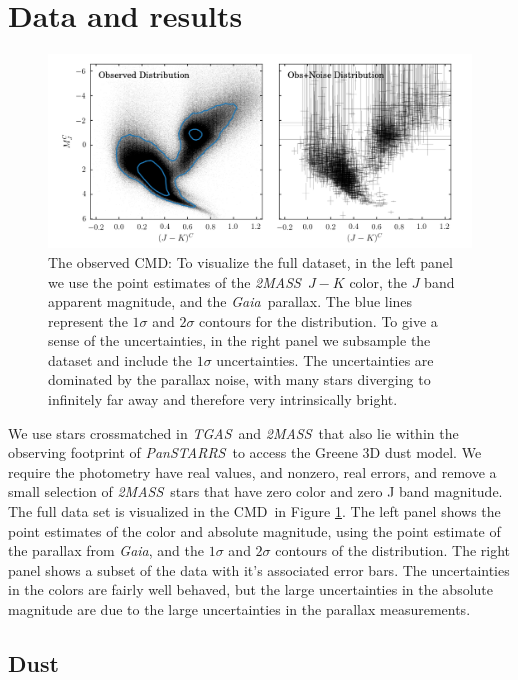 \documentclass[modern]{aastex61}
\newcommand{\acronym}[1]{{\small{#1}}}
\newcommand{\project}[1]{\textsl{#1}}
\newcommand{\tgas}{\project{\acronym{TGAS}}}
\newcommand{\tmass}{\project{\acronym{2MASS}}}
\newcommand{\gaia}{\project{Gaia}}
\newcommand{\panstarrs}{\project{Pan\acronym{STARRS}}}
\newcommand{\cmd}{\acronym{CMD}}
\begin{document}
\section{Data and results}
\begin{figure}
\centering
  \includegraphics[width=\textwidth]{data.png}
\caption{The observed \cmd: To visualize the full dataset, in the left panel we use the point estimates of the \tmass\ $J-K$ color, the $J$ band apparent magnitude, and the \gaia\ parallax. The blue lines represent the $1\sigma$ and $2\sigma$ contours for the distribution. To give a sense of the uncertainties, in the right panel we subsample the dataset and include the $1\sigma$ uncertainties. The uncertainties are dominated by the parallax noise, with many stars diverging to infinitely far away and therefore very intrinsically bright.}
\label{fig:data}
\end{figure}

We use stars crossmatched in \tgas\ and \tmass\, that also lie within the observing footprint of \panstarrs\ to access the Greene 3D dust model. We require the photometry have real values, and nonzero, real errors, and remove a small selection of \tmass\ stars that have zero color and zero J band magnitude. The full data set is visualized in the \cmd\ in Figure \ref{fig:data}. The left panel shows the point estimates of the color and absolute magnitude, using the point estimate of the parallax from \gaia, and the $1\sigma$ and $2\sigma$ contours of the distribution. The right panel shows a subset of the data with it's associated error bars. The uncertainties in the colors are fairly well behaved, but the large uncertainties in the absolute magnitude are due to the large uncertainties in the parallax measurements.

\subsection{Dust}
\end{document}
